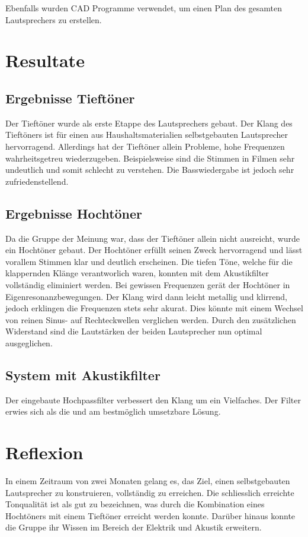 \documentclass[a4paper,11pt]{report}
\begin{document}
Ebenfalls wurden CAD Programme verwendet, um einen Plan des gesamten Lautsprechers zu erstellen.

\chapter{Resultate}

\section{Ergebnisse Tieftöner}
Der Tieftöner wurde als erste Etappe des Lautsprechers gebaut. Der Klang des Tieftöners ist für einen aus Haushaltsmaterialien selbstgebauten Lautsprecher hervorragend. Allerdings hat der Tieftöner allein Probleme, hohe Frequenzen wahrheitsgetreu wiederzugeben. Beispielsweise sind die Stimmen in Filmen sehr undeutlich und somit schlecht zu verstehen. Die Basswiedergabe ist jedoch sehr zufriedenstellend.

\section{Ergebnisse Hochtöner}
Da die Gruppe der Meinung war, dass der Tieftöner allein nicht ausreicht, wurde ein Hochtöner gebaut. Der Hochtöner erfüllt seinen Zweck hervorragend und lässt vorallem Stimmen klar und deutlich erscheinen. Die tiefen Töne, welche für die klappernden Klänge verantworlich waren, konnten mit dem Akustikfilter vollständig eliminiert werden. Bei gewissen Frequenzen gerät der Hochtöner in Eigenresonanzbewegungen. Der Klang wird dann leicht metallig und klirrend, jedoch erklingen die Frequenzen stets sehr akurat. Dies könnte mit einem Wechsel von reinen Sinus- auf Rechteckwellen verglichen werden. Durch den zusätzlichen Widerstand sind die Lautstärken der beiden Lautsprecher nun optimal ausgeglichen.

\section{System mit Akustikfilter}
Der eingebaute Hochpassfilter verbessert den Klang um ein Vielfaches. Der Filter erwies sich als die und am bestmöglich umsetzbare Lösung.
\chapter{Reflexion}

In einem Zeitraum von zwei Monaten gelang es, das Ziel, einen selbstgebauten Lautsprecher zu konstruieren, vollständig zu erreichen. Die schliesslich erreichte Tonqualität ist als gut zu bezeichnen, was durch die Kombination eines Hochtöners mit einem Tieftöner erreicht werden konnte. Darüber hinaus konnte die Gruppe ihr Wissen im Bereich der Elektrik und Akustik erweitern. 
\end{document}
